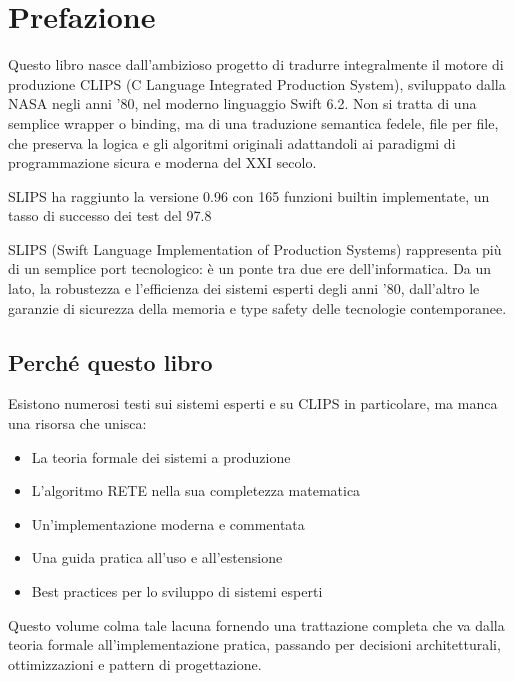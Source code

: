 \documentclass[12pt,a4paper,twoside,openright]{book}
\theoremstyle{definition}
\theoremstyle{remark}
\begin{document}
\chapter*{Prefazione}

Questo libro nasce dall'ambizioso progetto di tradurre integralmente il motore di produzione CLIPS (C Language Integrated Production System), sviluppato dalla NASA negli anni '80, nel moderno linguaggio Swift 6.2. Non si tratta di una semplice wrapper o binding, ma di una traduzione semantica fedele, file per file, che preserva la logica e gli algoritmi originali adattandoli ai paradigmi di programmazione sicura e moderna del XXI secolo.

SLIPS ha raggiunto la versione 0.96 con 165 funzioni builtin implementate, un tasso di successo dei test del 97.8%

SLIPS (Swift Language Implementation of Production Systems) rappresenta più di un semplice port tecnologico: è un ponte tra due ere dell'informatica. Da un lato, la robustezza e l'efficienza dei sistemi esperti degli anni '80, dall'altro le garanzie di sicurezza della memoria e type safety delle tecnologie contemporanee.

\section*{Perché questo libro}

Esistono numerosi testi sui sistemi esperti e su CLIPS in particolare, ma manca una risorsa che unisca:

\begin{itemize}
\item La teoria formale dei sistemi a produzione
\item L'algoritmo RETE nella sua completezza matematica
\item Un'implementazione moderna e commentata
\item Una guida pratica all'uso e all'estensione
\item Best practices per lo sviluppo di sistemi esperti
\end{itemize}

Questo volume colma tale lacuna fornendo una trattazione completa che va dalla teoria formale all'implementazione pratica, passando per decisioni architetturali, ottimizzazioni e pattern di progettazione.
\end{document}
